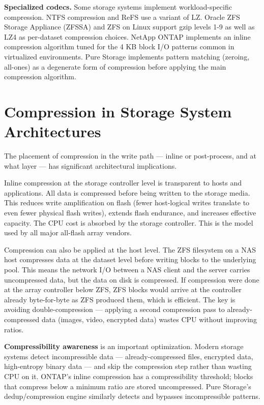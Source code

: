\textbf{Specialized codecs.} Some storage systems implement workload-specific compression. NTFS compression and ReFS use a variant of LZ. Oracle ZFS Storage Appliance (ZFSSA) and ZFS on Linux support gzip levels 1-9 as well as LZ4 as per-dataset compression choices. NetApp ONTAP implements an inline compression algorithm tuned for the 4 KB block I/O patterns common in virtualized environments. Pure Storage implements pattern matching (zeroing, all-ones) as a degenerate form of compression before applying the main compression algorithm.

\section{Compression in Storage System Architectures}
The placement of compression in the write path --- inline or post-process, and at what layer --- has significant architectural implications.

Inline compression at the storage controller level is transparent to hosts and applications. All data is compressed before being written to the storage media. This reduces write amplification on flash (fewer host-logical writes translate to even fewer physical flash writes), extends flash endurance, and increases effective capacity. The CPU cost is absorbed by the storage controller. This is the model used by all major all-flash array vendors.

Compression can also be applied at the host level. The ZFS filesystem on a NAS host compresses data at the dataset level before writing blocks to the underlying pool. This means the network I/O between a NAS client and the server carries uncompressed data, but the data on disk is compressed. If compression were done at the array controller below ZFS, ZFS blocks would arrive at the controller already byte-for-byte as ZFS produced them, which is efficient. The key is avoiding double-compression --- applying a second compression pass to already-compressed data (images, video, encrypted data) wastes CPU without improving ratios.

\textbf{Compressibility awareness} is an important optimization. Modern storage systems detect incompressible data --- already-compressed files, encrypted data, high-entropy binary data --- and skip the compression step rather than wasting CPU on it. ONTAP's inline compression has a compressibility threshold; blocks that compress below a minimum ratio are stored uncompressed. Pure Storage's dedup/compression engine similarly detects and bypasses incompressible patterns.

